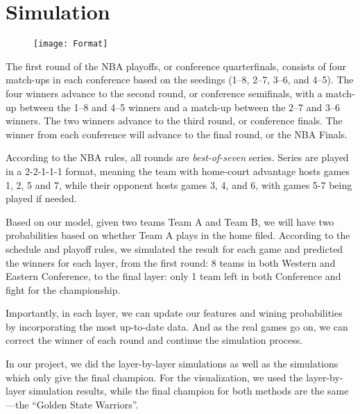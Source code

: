\section{Simulation}

\begin{figure}[h]
\centering
\texttt{[image: Format]}
\end{figure}

The first round of the NBA playoffs, or conference quarterfinals, consists of 
four match-ups in each conference based on the seedings (1–8, 2–7, 3–6, and 4–5).
The four winners advance to the second round, or conference semifinals, with a 
match-up between the 1–8 and 4–5 winners and a match-up between the 2–7 and 3–6
winners. The two winners advance to the third round, or conference finals.
The winner from each conference will advance to the final round, or the NBA Finals.

According to the NBA rules, all rounds are \textit{best-of-seven} series. Series are played
in a 2-2-1-1-1 format, meaning the team with home-court advantage hosts games
1, 2, 5 and 7, while their opponent hosts games 3, 4, and 6, with games 5-7 
being played if needed.

Based on our model, given two teams Team A and Team B, we will have two
probabilities based on whether Team A plays in the home filed.
According to the schedule and playoff rules, we simulated the result for 
each game and predicted the winners for each layer, from the first round:
8 teams in both Western and Eastern Conference, to the final layer: 
only 1 team left in both Conference and fight for the championship. 

Importantly, in each layer, we can update our features and wining probabilities
by incorporating the most up-to-date data. And as the real games go on, we can
correct the winner of each round and continue the simulation process. 

In our project, we did the layer-by-layer simulations as well as the
simulations which only give the final champion. For the visualization,
we used the layer-by-layer simulation results, while the final champion
for both methods are the same—the “Golden State Warriors”. 
